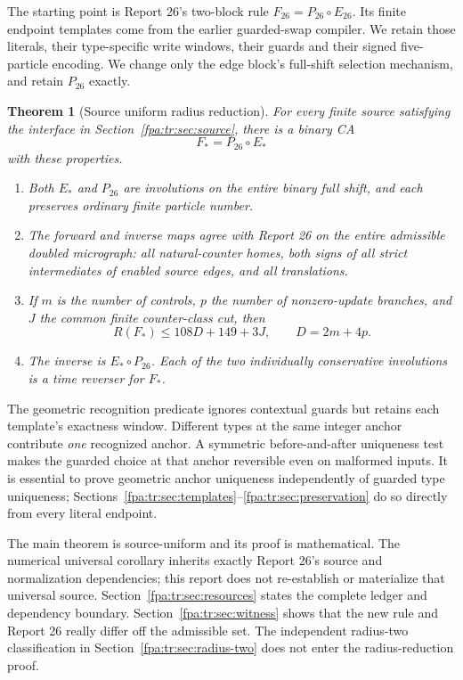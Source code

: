\documentclass[11pt,a4paper]{article}
\numberwithin{equation}{section}
\newtheorem{theorem}{Theorem}[section]
\newcommand{\Estar}{E_*}\newcommand{\Fstar}{F_*}
\newcommand{\Etwosix}{E_{26}}\newcommand{\Ptwosix}{P_{26}}\newcommand{\Ftwosix}{F_{26}}
\begin{document}
The starting point is Report 26's two-block rule $\Ftwosix=\Ptwosix\circ\Etwosix$. Its finite endpoint templates come from the earlier guarded-swap compiler. We retain those literals, their type-specific write windows, their guards and their signed five-particle encoding. We change only the edge block's full-shift selection mechanism, and retain $\Ptwosix$ exactly.

\begin{theorem}[Source uniform radius reduction]\label{fpa:tr:thm:main}
For every finite source satisfying the interface in Section~\ref{fpa:tr:sec:source}, there is a binary CA
\[
\Fstar=\Ptwosix\circ\Estar
\]
with these properties.
\begin{enumerate}
\item Both $\Estar$ and $\Ptwosix$ are involutions on the entire binary full shift, and each preserves ordinary finite particle number.
\item The forward and inverse maps agree with Report 26 on the entire admissible doubled micrograph: all natural-counter homes, both signs of all strict intermediates of enabled source edges, and all translations.
\item If $m$ is the number of controls, $p$ the number of nonzero-update branches, and $J$ the common finite counter-class cut, then
\begin{equation}\label{fpa:tr:eq:main-radius}
R(\Fstar)\le108D+149+3J,\qquad D=2m+4p.
\end{equation}
\item The inverse is $\Estar\circ\Ptwosix$. Each of the two individually conservative involutions is a time reverser for $\Fstar$.
\end{enumerate}
\end{theorem}

The geometric recognition predicate ignores contextual guards but retains each template's exactness window. Different types at the same integer anchor contribute \emph{one} recognized anchor. A symmetric before-and-after uniqueness test makes the guarded choice at that anchor reversible even on malformed inputs. It is essential to prove geometric anchor uniqueness independently of guarded type uniqueness; Sections~\ref{fpa:tr:sec:templates}--\ref{fpa:tr:sec:preservation} do so directly from every literal endpoint.

The main theorem is source-uniform and its proof is mathematical. The numerical universal corollary inherits exactly Report 26's source and normalization dependencies; this report does not re-establish or materialize that universal source. Section~\ref{fpa:tr:sec:resources} states the complete ledger and dependency boundary. Section~\ref{fpa:tr:sec:witness} shows that the new rule and Report 26 really differ off the admissible set. The independent radius-two classification in Section~\ref{fpa:tr:sec:radius-two} does not enter the radius-reduction proof.
\end{document}
